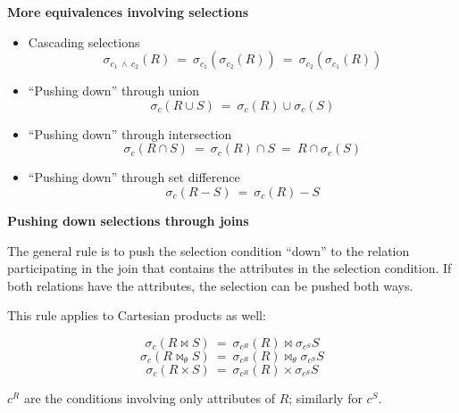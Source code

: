 \documentclass[xcolor={usenames,dvipsnames}]{beamer}
\begin{document}
%
%
\begin{frame}
\label{otherEquivalencesWithSelections}

\textbf{More equivalences involving selections}

\begin{itemize}
\item Cascading selections
\[\sigma_{c_1\ \wedge\ c_2}(R) \ = \ \sigma_{c_1}\left(\sigma_{c_2}(R)\right) \ = \ \sigma_{c_2}\left(\sigma_{c_1}(R)\right)\]

\item ``Pushing down'' through union
\[\sigma_c(R\cup S) \ = \ \sigma_c(R) \cup \sigma_c(S)\]

\item ``Pushing down'' through intersection
\[\sigma_c(R\cap S)\ = \ \sigma_c(R)\cap S \ = \ R \cap \sigma_c(S)\]

\item ``Pushing down'' through set difference
\[\sigma_c(R-S) \ = \ \sigma_c(R) - S\]
\end{itemize}
\end{frame}



%
%
\begin{frame}
\label{pushingDownSelectionsThroughJoins}

\textbf{Pushing down selections through joins}

The general rule is to push the selection condition ``down'' to the relation participating in the join that contains the attributes in the selection condition. If both relations have the attributes, the selection can be pushed both ways.

This rule applies to Cartesian products as well:

\[\sigma_c(R \Join S) \ = \ \sigma_{c^R}(R) \Join \sigma_{c^S}S\]
\[\sigma_c(R \Join_\theta S) \ = \ \sigma_{c^R}(R) \Join_\theta \sigma_{c^S}S\]
\[\sigma_c(R \times S) \ = \ \sigma_{c^R}(R) \times \sigma_{c^S}S\]

\vfill 

$c^R$ are the conditions involving only attributes of $R$; similarly for $c^S$.
\end{frame}
\end{document}
